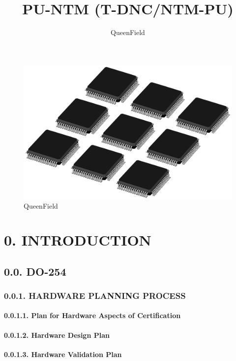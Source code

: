 \documentclass[]{article}
\title{PU-NTM (T-DNC/NTM-PU)}
\author{QueenField}
\date{}
\let\oldparagraph\paragraph
\renewcommand{\paragraph}[1]{\oldparagraph{#1}\mbox{}}
\begin{document}
\maketitle

\begin{figure}
\centering
\includegraphics{../icon.jpg}
\caption{QueenField}
\end{figure}

\section{0. INTRODUCTION}\label{introduction}

\subsection{0.0. DO-254}\label{do-254}

\subsubsection{0.0.1. HARDWARE PLANNING
PROCESS}\label{hardware-planning-process}

\paragraph{0.0.1.1. Plan for Hardware Aspects of
Certification}\label{plan-for-hardware-aspects-of-certification}

\paragraph{0.0.1.2. Hardware Design Plan}\label{hardware-design-plan}

\paragraph{0.0.1.3. Hardware Validation
Plan}\label{hardware-validation-plan}
\end{document}
